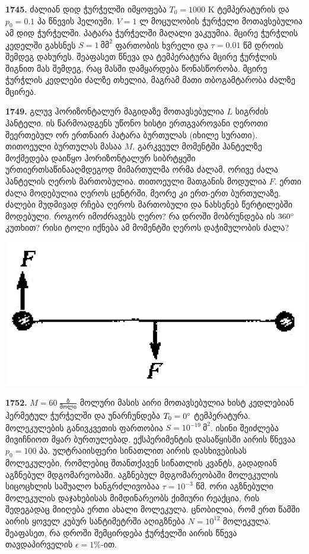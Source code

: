 \documentclass[12pt,a4paper,]{report}
\begin{document}
\textbf{1745.} ძალიან დიდ ჭურჭელში იმყოფება $T_0=1000$ K ტემპერატურის და $p_0=0.1$ პა წნევის ჰელიუმი. $V=1$ ლ მოცულობის ჭურჭელი მოთავსებულია ამ დიდ ჭურჭელში. პატარა ჭურჭელში მაღალი ვაკუუმია. მცირე ჭურჭლის კედელში გახსნეს $S=1\ \text{მმ}^2$ ფართობის ხვრელი და $\tau=0.01$ წმ დროის შემდეგ დახურეს. შეაფასეთ წნევა და ტემპერატურა მცირე ჭურჭლის შიგნით მას შემდეგ, რაც მასში დამყარდება წონასწორობა. მცირე ჭურჭლის კედლები ძალზე თხელია, მაგრამ მათი თბოგამტარობა ძალზე მცირეა.  

\textbf{1749.} გლუვ ჰორიზონტალურ მაგიდაზე მოთავსებულია $L$ სიგრძის ჰანტელი. ის წარმოადგენს უწონო ხისტი ერთგვაროვანი ღეროთი შეერთებულ ორ ერთნაირ პატარა ბურთულას (იხილე სურათი). თითოეული ბურთულას მასაა $M$. გარკვეულ მომენტში ჰანტელზე მოქმედება დაიწყო ჰორიზონტალურ სიბრტყეში ურთიერთსაწინააღმდეგოდ მიმართულმა ორმა ძალამ. ორივე ძალა ჰანტელის ღეროს მართობულია. თითოეული მათგანის მოდულია $F$. ერთი ძალა მოდებულია ღეროს ცენტრში, მეორე კი ერთ-ერთ ბურთულაზე. ძალები მუდმივად რჩება ღეროს მართობული და ნახსენებ წერტილებში მოდებული. როგორ იმოძრავებს ღერო? რა დროში მობრუნდება ის $360 \degree$ კუთხით? რისი ტოლი იქნება ამ მომენტში ღეროს დაჭიმულობის ძალა?
	\begin{center}
		\includegraphics[scale=0.3]{images/1749}
	\end{center}

\textbf{1752.} $M = 60\ \frac{\text{გ}}{\text{მოლი}}$ მოლური მასის აირი მოთავსებულია ხისტ კედლებიან ჰერმეტულ ჭურჭელში და უნარჩუნდება $T_0 = 0 \degree$ ტემპერატურა. მოლეკულების განივკვეთის ფართობია $S = 10^{-19}\ \text{მ}^2$. ისინი შეიძლება მივიჩნიოთ მყარ ბურთულებად. ექსპერიმენტის დასაწყისში აირის წნევაა $p_0 = 100$ პა. ულტრაიისფერი სინათლით აირის დასხივებისას მოლეკულები, რომლებიც შთანთქავენ სინათლის კვანტს, გადადიან აგზნებულ მდგომარეობაში. აგზნებულ მდგომარეობაში მოლეკულის სიცოცხლის საშუალო ხანგრძლივობაა $\tau = 10^{-3}$ წმ. ორი აგზნებული მოლეკულის დაჯახებისას მიმდინარეობს ქიმიური რეაქცია, რის შედეგადაც მიიღება ერთი ახალი მოლეკულა. ცნობილია, რომ ერთ წამში აირის ყოველ კუბურ სანტიმეტრში აღიგზნება $N = 10^{12}$ მოლეკულა. შეაფასეთ, რა დროში შემცირდება ჭურჭელში აირის წნევა თავდაპირველის $\epsilon = 1 \%$-ით.
\end{document}
